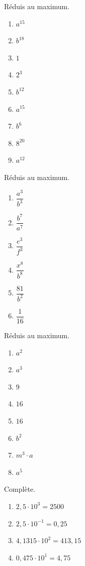 \begin{exercise}
  Réduis au maximum.
  \begin{enumerate}[cols=6]
\item \(a^{15} \)
\item \(b^{18} \)
\item \(1 \)
\item \(2^{3} \)
\item \(b^{12} \)
\item \(a^{15} \)
\item \(b^{6} \)
\item \(8^{20} \)
\item \(a^{12} \)
  \end{enumerate}
\end{exercise}

\begin{exercise}
  Réduis au maximum.
  \begin{enumerate}[cols=6]
    \item \(\dfrac{a^{3}}{b^{3}}\)
    \item \(\dfrac{b^{7}}{a^{7}}\)
    \item \(\dfrac{e^{3}}{f^{3}}\)
    \item \(\dfrac{x^{8} }{b^{8}}\)
    \item \(\dfrac{81}{b^{2}}\)
    \item \(\dfrac{1}{16}\)
  \end{enumerate}
\end{exercise}

\begin{exercise}
  Réduis au maximum.
  \begin{enumerate}[cols=4]
    \item \(a^2 \)
    \item \(a^3 \)
    \item \(9 \)
    \item \(16\)
    \item \(16\)
    \item \(b^2\)
    \item \(m^3\cdot a\)
    \item \(a^5\)

  \end{enumerate}
\end{exercise}

\begin{exercise}
  Complète.
  \begin{enumerate}[cols=2]
    \item \(2,5 \cdot 10^{3} = 2500\)
    \item\(2,5 \cdot 10^{-1} = 0,25\)
    \item\(4,1315 \cdot 10^{2} = 413,15\)
    \item\(0,475 \cdot 10^{1} = 4,75\)
  \end{enumerate}
\end{exercise}



